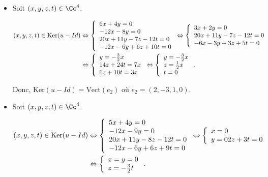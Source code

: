 {\begin{enumerate}
{\begin{itemize}
Donc, $\mbox{Ker}(u+Id)=\mbox{Vect}(e_1)$ où $e_1=(1,-2,2,-1)$.
\item[- Cas $\lambda=1$.]
Soit $(x,y,z,t)\in\Cc^4$.

\begin{align*}\ensuremath
(x,y,z,t)\in\mbox{Ker}(u-Id)&\Leftrightarrow\left\{
\begin{array}{l}
6x+4y=0\\
-12x-8y=0\\
20x+11y-7z-12t=0\\
-12x-6y+6z+10t=0
\end{array}
\right.\Leftrightarrow\left\{
\begin{array}{l}
3x+2y=0\\
20x+11y-7z-12t=0\\
-6x-3y+3z+5t=0
\end{array}
\right.
\\
 &\Leftrightarrow\left\{
\begin{array}{l}
y=-\frac{3}{2}x\\
14z+24t=7x\\
6z+10t=3x
\end{array}
\right.
\Leftrightarrow
\left\{
\begin{array}{l}
y=-\frac{3}{2}x\\
z=\frac{1}{2}x\\
t=0
\end{array}
\right..
\end{align*}

Donc, $\mbox{Ker}(u-Id)=\mbox{Vect}(e_2)$ où $e_2=(2,-3,1,0)$.
\item[- Cas $\lambda=2$.]

Soit $(x,y,z,t)\in\Cc^4$.

\begin{align*}\ensuremath
(x,y,z,t)\in\mbox{Ker}(u-Id)&\Leftrightarrow\left\{
\begin{array}{l}
5x+4y=0\\
-12x-9y=0\\
20x+11y-8z-12t=0\\
-12x-6y+6z+9t=0
\end{array}
\right.\Leftrightarrow\left\{
\begin{array}{l}
x=0\\
y=0
2z+3t=0
\end{array}
\right.
\\
 &\Leftrightarrow\left\{
\begin{array}{l}
x=y=0\\
z=-\frac{3}{2}t
\end{array}
\right.
.
\end{align*}


\end{itemize}}
\end{enumerate}}
